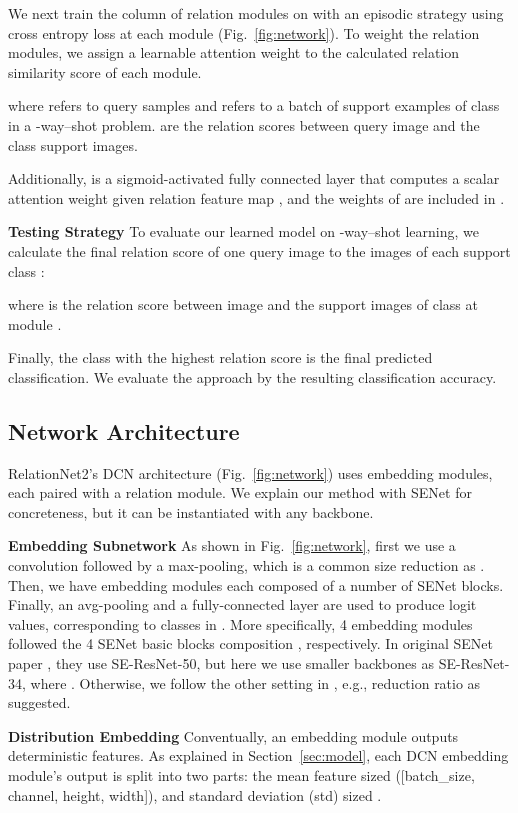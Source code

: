 \documentclass[conference]{IEEEtran}
\def\modelnameshort{DCN}
\newcommand{\keypoint}[1]{\vspace{0.05cm}\noindent\textbf{#1}\quad}
\begin{document}
We next train the column of relation modules  on   with an episodic strategy \cite{vinyals2016matching} using cross entropy loss  at each module (Fig.~\ref{fig:network}). To weight the  relation modules, we assign a learnable attention weight  to the calculated relation similarity score  of each module. 


where  refers to query samples and  refers to a batch of  support examples of class  in a -way--shot problem.  are the relation scores between query image  and the class  support images.

Additionally,  is a sigmoid-activated fully connected layer that computes a scalar attention weight given relation feature map , and the weights of  are included in .

\keypoint{Testing Strategy} 
To evaluate our learned model on -way--shot learning, we calculate the final relation score  of one query image  to the images of each support class :


where  is the relation score between image  and the support images of class  at module .

Finally, the class with the highest relation score  is the final predicted classification. We evaluate the approach by the resulting classification accuracy.

\subsection{Network Architecture}
\label{sec:arch}

RelationNet2's \modelnameshort{} architecture (Fig.~\ref{fig:network}) uses  embedding modules, each paired with a relation module. We explain our method with SENet for concreteness, but it can be instantiated with any backbone.

\keypoint{Embedding Subnetwork} 
As shown in Fig.~\ref{fig:network}, first we use a  convolution followed by a  max-pooling, which is a common size reduction as \cite{hu2018senet}. Then, we have  embedding modules each composed of a number of SENet blocks. Finally, an avg-pooling and a fully-connected layer are used to produce  logit values, corresponding to  classes in . More specifically, 4 embedding modules followed the 4 SENet basic blocks composition , respectively.
In original SENet paper \cite{hu2018senet}, they use SE-ResNet-50, but here we use smaller backbones as SE-ResNet-34, where . Otherwise, we follow the other setting in \cite{hu2018senet}, e.g., reduction ratio  as suggested.

\keypoint{Distribution Embedding}
Conventually, an embedding module outputs deterministic features. As explained in  Section~\ref{sec:model}, each DCN embedding module's output is split into two parts: the mean feature  sized  ([batch\_size, channel, height, width]), and standard deviation (std)  sized . 
\end{document}

